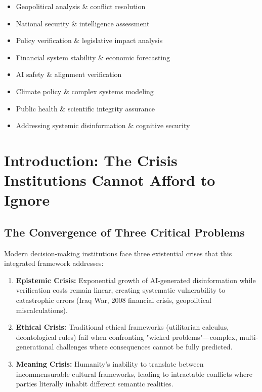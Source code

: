 \documentclass[11pt,a4paper]{article}
\theoremstyle{definition}
\theoremstyle{remark}
\begin{document}
\begin{small}
\begin{center}
\begin{minipage}{0.88\textwidth}
\begin{itemize}[nosep, itemsep=0.2em, topsep=0pt, leftmargin=1.5em]
    \item Geopolitical analysis \& conflict resolution
    \item National security \& intelligence assessment
    \item Policy verification \& legislative impact analysis
    \item Financial system stability \& economic forecasting
    \item AI safety \& alignment verification
    \item Climate policy \& complex systems modeling
    \item Public health \& scientific integrity assurance
    \item Addressing systemic disinformation \& cognitive security
\end{itemize}
\end{minipage}
\end{center}
\end{small}

\clearpage

\section{Introduction: The Crisis Institutions Cannot Afford to Ignore}

\subsection{The Convergence of Three Critical Problems}

Modern decision-making institutions face three existential crises that this integrated framework addresses:

\begin{enumerate}[label=\textbf{\arabic*.},leftmargin=*]
\item \textbf{Epistemic Crisis:} Exponential growth of AI-generated disinformation while verification costs remain linear, creating systematic vulnerability to catastrophic errors (Iraq War, 2008 financial crisis, geopolitical miscalculations).

\item \textbf{Ethical Crisis:} Traditional ethical frameworks (utilitarian calculus, deontological rules) fail when confronting "wicked problems"—complex, multi-generational challenges where consequences cannot be fully predicted.

\item \textbf{Meaning Crisis:} Humanity's inability to translate between incommensurable cultural frameworks, leading to intractable conflicts where parties literally inhabit different semantic realities.
\end{enumerate}
\end{document}
